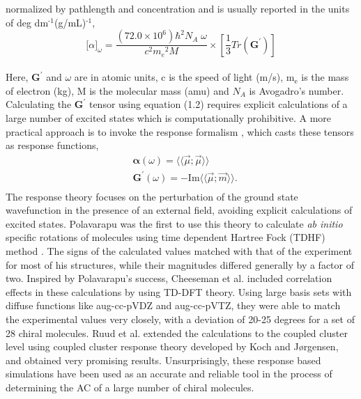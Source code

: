 normalized by pathlength and concentration and is usually reported in the units of deg dm$^{\text{-1}}$(g/mL)$^{\text{-1}}$,\cite{Crawford06}
\\
\begin{equation}
{\lbrack\alpha\rbrack}_{\omega} = \frac{(72.0 \times 10^6){\hbar}^2 N_A\;\omega}{c^2{m_e}^2 M} \times \left[ \frac{1}{3}Tr(\textbf{G}^\prime)\right]
\end{equation}
\\
Here, $\textbf{G}^\prime$ and $\omega$ are in atomic units, c is the speed of light (m/s), m$_{\text{e}}$ is the 
mass of electron (kg), M is the molecular mass (amu) and $N_A$ is Avogadro's number. Calculating the 
$\textbf{G}^\prime$ tensor using equation (1.2) requires explicit calculations of a large number of 
excited states which is computationally prohibitive. A more practical approach is to invoke the response formalism
\cite{Koch90,Kobayashi94}, which casts these tensors as response functions,
\begin{equation}
\begin{split}
&\bm{\alpha}(\omega) = \langle\langle\vec{\mu};\vec{\mu}\rangle\rangle\\
&\textbf{G}^{\prime}(\omega) = -\text{Im}\langle\langle\vec{\mu};\vec{m}\rangle\rangle.\\
\end{split}
\end{equation} 
The response theory focuses on the perturbation of the ground state wavefunction in the presence of an external 
field, avoiding explicit calculations of excited states. Polavarapu was the first to use this theory to calculate 
{\em ab initio} specific rotations of molecules using time dependent Hartree Fock (TDHF) method \cite{Polavarapu96}. 
The signs of the calculated values matched with that of the experiment for most of his structures, while their magnitudes 
differed generally by a factor of two. Inspired by Polavarapu's success, Cheeseman et al. \cite{Cheeseman00,Stephens01} 
included correlation effects in these calculations by using TD-DFT theory. Using large basis sets with diffuse functions like 
aug-cc-pVDZ and aug-cc-pVTZ,\cite{Dunning89,Kendall92,Woon94} they were able to match the experimental values very closely, with a 
deviation of 20-25 degrees for a set of 28 chiral molecules. Ruud et al. extended the calculations to the coupled cluster 
level using coupled cluster response theory developed by Koch and J{\o}rgensen\cite{Koch90}, and obtained very 
promising results\cite{Ruud03}. Unsurprisingly, these response based simulations have been used as an accurate and 
reliable tool in the process of determining the AC of a large number of chiral molecules\cite{Kondru99}. 
